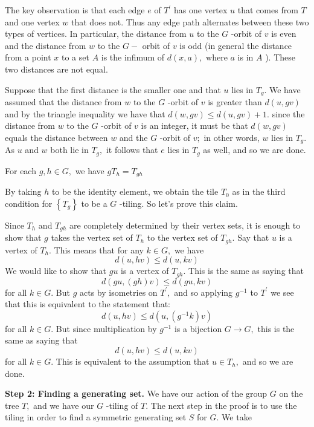\par
The key observation is that each edge $e$ of $T^{\prime}$ has one vertex $u$ that comes from $T$ and one vertex $w$ that does not. Thus any edge path alternates between these two types of vertices. In particular, the distance from $u$ to the $G$ -orbit of $v$ is even and the distance from $w$ to the $G-$ orbit of $v$ is odd (in general the distance from a point $x$ to a set $A$ is the infimum of $d(x, a),$ where $a$ is in $A$ ). These two distances are not equal.
\par
Suppose that the first distance is the smaller one and that $u$ lies in $T_{g}$. We have assumed that the distance from $w$ to the $G$ -orbit of $v$ is greater than $d(u, g v)$ and by the triangle inequality we have that $d(w, g v) \leq d(u, g v)+1 .$ since the distance from $w$ to the $G$ -orbit of $v$ is an integer, it must be that $d(w, g v)$ equals the distance between $w$ and the $G$ -orbit of $v ;$ in other words, $w$ lies in $T_{g} .$ As $u$ and $w$ both lie in $T_{g},$ it follows that $e$ lies in $T_{g}$ as well, and so we are done.
\begin{claim}
For each $g, h \in G,$ we have $g T_{h}=T_{g h}$
\end{claim}
By taking $h$ to be the identity element, we obtain the tile $T_{0}$ as in the third condition for $\left\{T_{g}\right\}$ to be a $G$ -tiling. So let's prove this claim. 
\par
Since $T_{h}$ and $T_{g h}$ are completely determined by their vertex sets, it is enough to show that $g$ takes the vertex set of $T_{h}$ to the vertex set of $T_{g h} .$ Say that $u$ is a vertex of $T_{h} .$ This means that for any $k \in G,$ we have
\[
d(u, h v) \leq d(u, k v)
\]
We would like to show that $g u$ is a vertex of $T_{g h} .$ This is the same as saying that
\[
d(g u,(g h) v) \leq d(g u, k v)
\]
for all $k \in G .$ But $g$ acts by isometries on $T^{\prime},$ and so applying $g^{-1}$ to $T^{\prime}$ we see that this is equivalent to the statement that:
\[
d(u, h v) \leq d\left(u,\left(g^{-1} k\right) v\right)
\]
for all $k \in G .$ But since multiplication by $g^{-1}$ is a bijection $G \rightarrow G,$ this is the same as saying that
\[
d(u, h v) \leq d(u, k v)
\]
for all $k \in G .$ This is equivalent to the assumption that $u \in T_{h},$ and so we are done.
\par\noindent
\textbf{Step 2: Finding a generating set.} We have our action of the group $G$ on the tree $T,$ and we have our $G$ -tiling of $T .$ The next step in the proof is to use the tiling in order to find a symmetric generating set $S$ for $G .$ We take
